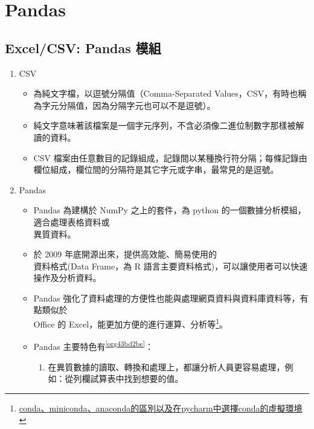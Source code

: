 \documentclass[a4paper,12pt]{article}
\begin{document}
\section{Pandas}
\label{sec:orgc1437d0}
\subsection{Excel/CSV: Pandas 模組}
\label{sec:orge16f27f}
\begin{enumerate}
\item CSV
\label{sec:org71403ea}
\begin{itemize}
\item 為純文字檔，以逗號分隔值（Comma-Separated Values，CSV，有時也稱為字元分隔值，因為分隔字元也可以不是逗號）。\\
\item 純文字意味著該檔案是一個字元序列，不含必須像二進位制數字那樣被解讀的資料。\\
\item CSV 檔案由任意數目的記錄組成，記錄間以某種換行符分隔；每條記錄由欄位組成，欄位間的分隔符是其它字元或字串，最常見的是逗號。\\
\end{itemize}
\item Pandas
\label{sec:org6f709c0}
\begin{itemize}
\item Pandas 為建構於 NumPy 之上的套件，為 python 的一個數據分析模組，適合處理表格資料或\\
異質資料。\\
\item 於 2009 年底開源出來，提供高效能、簡易使用的\\
資料格式(Data Frame，為 R 語言主要資料格式)，可以讓使用者可以快速操作及分析資料。\\
\item Pandas 強化了資料處理的方便性也能與處理網頁資料與資料庫資料等，有點類似於\\
Office 的 Excel，能更加方便的進行運算、分析等\footnote{\href{https://blog.csdn.net/qq\_18668137/article/details/80807829}{conda、miniconda、anaconda的區別以及在pycharm中選擇conda的虛擬環境}\\}。\\
\item Pandas 主要特色有\textsuperscript{\ref{org43bd2be}}：\\
\begin{enumerate}
\item 在異質數據的讀取、轉換和處理上，都讓分析人員更容易處理，例如：從列欄試算表中找到想要的值。\\

\end{enumerate}
\end{itemize}
\end{enumerate}
\end{document}
